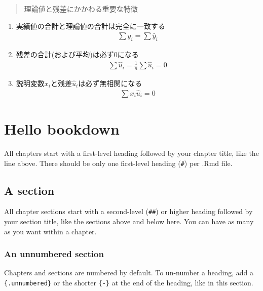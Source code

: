 \documentclass[
]{book}
\theoremstyle{definition}
\theoremstyle{definition}
\theoremstyle{definition}
\theoremstyle{definition}
\theoremstyle{remark}
\begin{document}
\begin{quote}
理論値と残差にかかわる重要な特徴
\end{quote}

\begin{enumerate}
\def\labelenumi{\arabic{enumi}.}
\item
  実績値の合計と理論値の合計は完全に一致する
  \begin{align*}
  \sum y_i=\sum \hat{y}_i
  \end{align*}
\item
  残差の合計(および平均)は必ず0になる
  \begin{align*}
  \sum \hat{u}_i=\frac{1}{n} \sum \hat{u}_i=0
  \end{align*}
\item
  説明変数\(x_i\)と残差\(\hat{u}_i\)は必ず無相関になる
  \begin{align*}
  \sum x_i \hat{u}_i=0
  \end{align*}
\end{enumerate}

\hypertarget{hello-bookdown-1}{%
\chapter{Hello bookdown}\label{hello-bookdown-1}}

All chapters start with a first-level heading followed by your chapter title, like the line above. There should be only one first-level heading (\texttt{\#}) per .Rmd file.

\hypertarget{a-section-1}{%
\section{A section}\label{a-section-1}}

All chapter sections start with a second-level (\texttt{\#\#}) or higher heading followed by your section title, like the sections above and below here. You can have as many as you want within a chapter.

\hypertarget{an-unnumbered-section-1}{%
\subsection*{An unnumbered section}\label{an-unnumbered-section-1}}

Chapters and sections are numbered by default. To un-number a heading, add a \texttt{\{.unnumbered\}} or the shorter \texttt{\{-\}} at the end of the heading, like in this section.
\end{document}
